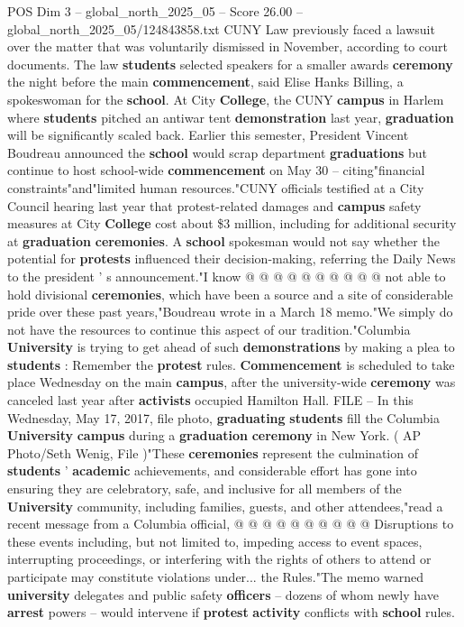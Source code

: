 \begin{textsample}{POS Dim 3 – global\_north\_2025\_05 – Score 26.00 – global\_north\_2025\_05/124843858.txt}
CUNY Law previously faced a lawsuit over the matter that was voluntarily dismissed in November, according to court documents.
The law \textbf{students} selected speakers for a smaller awards \textbf{ceremony} the night before the main \textbf{commencement}, said Elise Hanks Billing, a spokeswoman for the \textbf{school}.
At City \textbf{College}, the CUNY \textbf{campus} in Harlem where \textbf{students} pitched an antiwar tent \textbf{demonstration} last year, \textbf{graduation} will be significantly scaled back.
Earlier this semester, President Vincent Boudreau announced the \textbf{school} would scrap department \textbf{graduations} but continue to host school-wide \textbf{commencement} on May 30 -- citing"financial constraints"and"limited human resources."CUNY officials testified at a City Council hearing last year that protest-related damages and \textbf{campus} safety measures at City \textbf{College} cost about \$3 million, including for additional security at \textbf{graduation} \textbf{ceremonies}.
A \textbf{school} spokesman would not say whether the potential for \textbf{protests} influenced their decision-making, referring the Daily News to the president ' s announcement."I know @ @ @ @ @ @ @ @ @ @ not able to hold divisional \textbf{ceremonies}, which have been a source and a site of considerable pride over these past years,"Boudreau wrote in a March 18 memo."We simply do not have the resources to continue this aspect of our tradition."Columbia \textbf{University} is trying to get ahead of such \textbf{demonstrations} by making a plea to \textbf{students} : Remember the \textbf{protest} rules. \textbf{Commencement} is scheduled to take place Wednesday on the main \textbf{campus}, after the university-wide \textbf{ceremony} was canceled last year after \textbf{activists} occupied Hamilton Hall.
FILE -- In this Wednesday, May 17, 2017, file photo, \textbf{graduating} \textbf{students} fill the Columbia \textbf{University} \textbf{campus} during a \textbf{graduation} \textbf{ceremony} in New York. ( AP Photo/Seth Wenig, File )"These \textbf{ceremonies} represent the culmination of \textbf{students} ' \textbf{academic} achievements, and considerable effort has gone into ensuring they are celebratory, safe, and inclusive for all members of the \textbf{University} community, including families, guests, and other attendees,"read a recent message from a Columbia official, @ @ @ @ @ @ @ @ @ @ Disruptions to these events including, but not limited to, impeding access to event spaces, interrupting proceedings, or interfering with the rights of others to attend or participate may constitute violations under... the Rules."The memo warned \textbf{university} delegates and public safety \textbf{officers} -- dozens of whom newly have \textbf{arrest} powers -- would intervene if \textbf{protest} \textbf{activity} conflicts with \textbf{school} rules.

\end{textsample}

